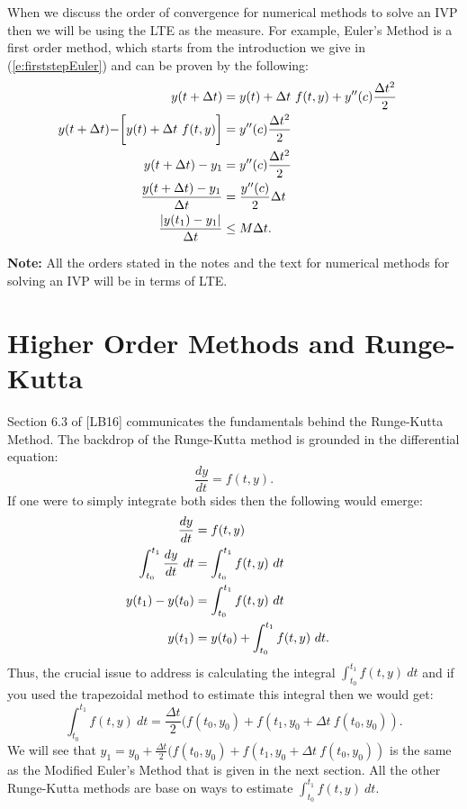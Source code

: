 \documentclass[twoside]{article}
\renewcommand{\cite}[1]{[#1]}
\def\ds{\displaystyle}
\begin{document}
\par \noindent
When we discuss the order of convergence for numerical methods to solve an IVP then we will be using the LTE as the measure. For example, Euler's Method is a first order method, which starts from the introduction we give in (\ref{e:firststepEuler}) and can be proven by the following:
\begin{align*}
    y(t+\Delta t) &= y(t) + \Delta t \ f(t,y) + y''(c) \frac {\Delta t^2}2 \cr
    y(t+\Delta t) -\biggr [ y(t) + \Delta t \ f(t,y) \biggr ]&= y''(c) \frac {\Delta t^2}2  \cr
    y(t+\Delta t) - y_1 &= y''(c) \frac {\Delta t^2}2 \cr
    \frac {y(t+\Delta t) - y_1}{\Delta t} &= \frac {y''(c)}2 \Delta t \cr
    \frac {\vert y(t_1) - y_1 \vert }{\Delta t} & \le M \Delta t.
\end{align*}

{\bf Note:} {\color{teal} All the orders stated in the notes and the text for numerical methods for solving an IVP will be in terms of LTE.}

\section{Higher Order Methods and Runge-Kutta}
Section 6.3 of \cite{LB16} communicates the fundamentals behind the Runge-Kutta Method. The backdrop of the Runge-Kutta method is grounded in the differential equation:
$$\frac {dy}{dt} = f(t,y).$$
If one were to simply integrate both sides then the following would emerge:
\begin{align}
    \frac {dy}{dt} &= f(t,y) \cr
    \int_{t_0}^{t_1} \frac {dy}{dt} \ dt&=  \int_{t_0}^{t_1}f(t,y) \ dt \cr
    y(t_1) - y(t_0) &=  \int_{t_0}^{t_1}f(t,y) \ dt \cr
    y(t_1) &=  y(t_0) + \int_{t_0}^{t_1}f(t,y) \ dt. 
    \label{e:RK_origins}
\end{align}
Thus, the crucial issue to address is calculating the integral $\ds \int_{t_0}^{t_1}f(t,y) \ dt$ and if you used the trapezoidal method to estimate this integral then we would get:
$$\int_{t_0}^{t_1}f(t,y) \ dt = \frac {\Delta t}2 (f(t_0,y_0) + f(t_1,y_0+\Delta t \ f(t_0,y_0)).$$
We will see that $\ds y_1 = y_0 + \frac {\Delta t}2 (f(t_0,y_0) + f(t_1,y_0+\Delta t \ f(t_0,y_0)) $ is the same as the Modified Euler's Method that is given in the next section. All the other Runge-Kutta methods are base on ways to estimate $\ds \int_{t_0}^{t_1}f(t,y) \ dt$.
\end{document}
